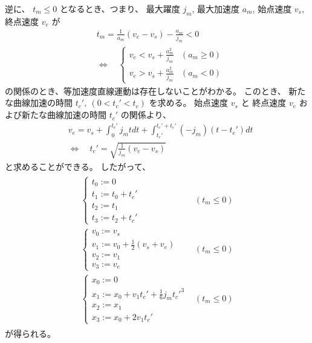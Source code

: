 \documentclass[a5paper]{ltjsarticle}
\begin{document}
逆に、 $t_m \leq 0$ となるとき、つまり、
最大躍度 $j_m$, 最大加速度 $a_m$, 始点速度 $v_s$, 終点速度 $v_e$ が
\begin{align}
     &
    t_m = \frac{1}{a_m}(v_e-v_s) - \frac{a_m}{j_m} < 0
    \\
     &
    \Leftrightarrow
    \quad
    \left\{
    \begin{array}{ll}
        v_e < v_s + \frac{a_m^2}{j_m} & (a_m \ge 0)
        \\
        v_e > v_s + \frac{a_m^2}{j_m} & (a_m <0)
    \end{array}
    \right.
\end{align}
の関係のとき、等加速度直線運動は存在しないことがわかる。
このとき、
新たな曲線加速の時間 $t_c',~(0 < t_c' < t_c)$ を求める。
始点速度 $v_s$ と 終点速度 $v_e$ および新たな曲線加速の時間 $t_c'$ の関係より、
\begin{align}
     &
    v_e = v_s + \int_{0}^{t_c'} j_m t dt + \int_{t_c'}^{t_c'+t_c'} (-j_m) (t-t_c') dt
    \\
     &
    \Leftrightarrow\quad
    t_c' = \sqrt{\frac{1}{j_m}(v_e-v_s)}
\end{align}
と求めることができる。
したがって、
\begin{align}
    \begin{array}{ll}
        \left\{ \begin{array}{l}
            t_0 := 0          \\
            t_1 := t_0 + t_c' \\
            t_2 := t_1        \\
            t_3 := t_2 + t_c'
        \end{array} \right.
         &
        (t_m \leq 0)
        \\
        \left\{ \begin{array}{l}
            v_0 := v_s                                     \\
            v_1 := v_0 + \frac{1}{2}\left( v_s+v_e \right) \\
            v_2 := v_1                                     \\
            v_3 := v_e
        \end{array} \right.
         &
        (t_m \leq 0)
        \\
        \left\{ \begin{array}{l}
            x_0 := 0                                       \\
            x_1 := x_0 + v_1 t_c' + \frac{1}{6} j_m t_c'^3 \\
            x_2 := x_1                                     \\
            x_3 := x_0 + 2 v_1 t_c'
        \end{array} \right.
         &
        (t_m \leq 0)
    \end{array}
\end{align}
が得られる。
\end{document}
